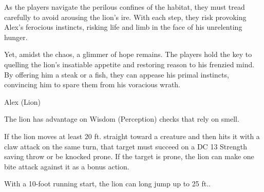 As the players navigate the perilous confines of the habitat, they must tread carefully to avoid arousing the lion's ire. With each step, they risk provoking Alex's ferocious instincts, risking life and limb in the face of his unrelenting hunger.

Yet, amidst the chaos, a glimmer of hope remains. The players hold the key to quelling the lion's insatiable appetite and restoring reason to his frenzied mind. By offering him a steak or a fish, they can appease his primal instincts, convincing him to spare them from his voracious wrath.
\hfill\\\eject
\begin{DndMonster}[width=0.5\textwidth]{Alex (Lion)}

	\DndMonsterBasics[
		armor-class = {15 (Natural Armor)},
		hit-points  = {\DndDice{8d10 + 8}},
		speed       = {50 ft.},
	]

	\renewcommand{\AbilityScoreSpacer}{~}

	\DndMonsterAbilityScores[
		str = 17,
		dex = 15,
		con = 13,
		int = 3,
		wis = 12,
		cha = 8,
	]

	\DndMonsterDetails[
		skills = {Perception +3, Stealth +6},
		senses = {passive Perception 13},
		languages = {Common},
		challenge = 3,
	]

	The lion has advantage on Wisdom (Perception) checks that rely on smell.
	
	If the lion moves at least 20 ft. straight toward a creature and then hits it with a claw attack on the same turn, that target must succeed on a DC 13 Strength saving throw or be knocked prone. If the target is prone, the lion can make one bite attack against it as a bonus action.
	
	With a 10-foot running start, the lion can long jump up to 25 ft..
	

	\DndMonsterAttack[
		name=Bite,
		distance=melee, %
		mod=+5,
		reach=5,
		targets=one target,
		dmg={\DndDice{1d8 + 3}},
		dmg-type=piercing,
	]
	
	\DndMonsterAttack[
		name=Claw,
		distance=melee, %
		mod=+8,
		reach=5,
		targets=one target,
		dmg={\DndDice{1d6 + 3}},
		dmg-type=slashing,
	]
\end{DndMonster}
